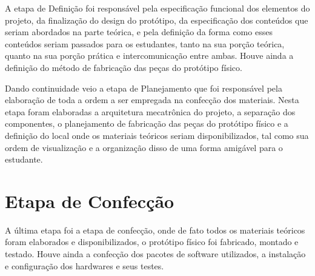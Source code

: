 A etapa de Definição foi responsável pela especificação funcional dos elementos do projeto, da finalização do design do protótipo, da especificação dos conteúdos que seriam abordados na parte teórica, e pela definição da forma como esses conteúdos seriam passados para os estudantes, tanto na sua porção teórica, quanto na sua porção prática e intercomunicação entre ambas. Houve ainda a definição do método de fabricação das peças do protótipo físico.

Dando continuidade veio a etapa de Planejamento que foi responsável pela elaboração de toda a ordem a ser empregada na confecção dos materiais. Nesta etapa foram elaboradas a arquitetura mecatrônica do projeto, a separação dos componentes, o planejamento de fabricação das peças do protótipo físico e a definição do local onde os materiais teóricos seriam disponibilizados, tal como sua ordem de visualização e a organização disso de uma forma amigável para o estudante.

\section{Etapa de Confecção}
A última etapa foi a etapa de confecção, onde de fato todos os materiais teóricos foram elaborados e disponibilizados, o protótipo físico foi fabricado, montado e testado. Houve ainda a confecção dos pacotes de software utilizados, a instalação e configuração dos hardwares e seus testes.


